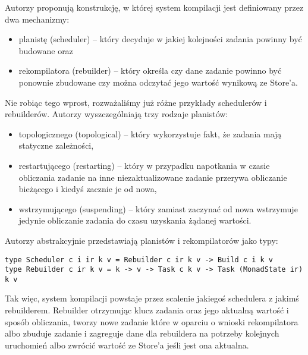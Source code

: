 Autorzy proponują konstrukcję, w której system kompilacji jest definiowany przez dwa mechanizmy:
\begin{itemize}
\item planistę (scheduler) -- który decyduje w jakiej kolejności zadania powinny być budowane oraz
\item rekompilatora (rebuilder) -- który określa czy dane zadanie powinno być ponownie zbudowane czy można odczytać jego wartość wynikową ze Store'a.
\end{itemize}

Nie robiąc tego wprost, rozważaliśmy już różne przykłady schedulerów i rebuilderów. Autorzy wyszczególniają trzy rodzaje planistów:

\begin{itemize}
\item topologicznego (topological) -- który wykorzystuje fakt, że zadania mają statyczne zależności,
\item restartującego (restarting) -- który w przypadku napotkania w czasie obliczania zadanie na inne niezaktualizowane zadanie przerywa obliczanie bieżącego i kiedyś zacznie je od nowa,
\item wstrzymującego (suspending) -- który zamiast zaczynać od nowa wstrzymuje jedynie obliczanie zadania do czasu uzyskania żądanej wartości.
\end{itemize}

Autorzy abstrakcyjnie przedstawiają planistów i rekompilatorów jako typy:

\begin{lstlisting}
type Scheduler c i ir k v = Rebuilder c ir k v -> Build c i k v
type Rebuilder c ir k v = k -> v -> Task c k v -> Task (MonadState ir) k v
\end{lstlisting}

Tak więc, system kompilacji powstaje przez scalenie jakiegoś schedulera z jakimś rebuilderem. Rebuilder otrzymując klucz zadania oraz jego aktualną wartość i sposób obliczania, tworzy nowe zadanie które w oparciu o wnioski rekompilatora albo zbuduje zadanie i zagreguje dane dla rebuildera na potrzeby kolejnych uruchomień albo zwrócić wartość ze Store'a jeśli jest ona aktualna.

